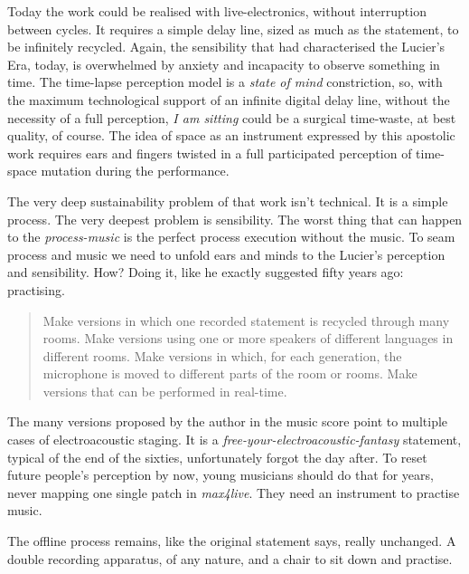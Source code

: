 \documentclass[twoside,a4paper]{article}
\begin{document}
Today the work could be realised with live-electronics, without interruption
between cycles. It requires a simple delay line, sized as much as the statement,
to be infinitely recycled. Again, the sensibility that had characterised the
Lucier's Era, today, is overwhelmed by anxiety and incapacity to observe something
in time. The time-lapse perception model is a \emph{state of mind} constriction,
so, with the maximum technological support of an infinite digital delay line,
without the necessity of a full perception, \emph{I am sitting} could be a
surgical time-waste, at best quality, of course. The idea of space as an
instrument expressed by this apostolic work requires ears and fingers twisted
in a full participated perception of time-space mutation during the performance.


The very deep sustainability problem of that work isn't technical. It is a
simple process. The very deepest problem is sensibility. The worst thing that
can happen to the \emph{process-music} is the perfect process execution without
the music. To seam process and music we need to unfold ears and minds to the
Lucier's perception and sensibility. How? Doing it, like he exactly suggested
fifty years ago: practising.

\begin{quote}
Make versions in which one recorded statement is recycled through many rooms.
Make versions using one or more speakers of different languages in different
rooms. Make versions in which, for each generation, the microphone is moved to
different parts of the room or rooms. Make versions that can be performed in
real-time. \cite{lais69}
\end{quote}

The many versions proposed by the author in the music score point to multiple
cases of electroacoustic staging. It is a \emph{free-your-electroacoustic-fantasy}
statement, typical of the end of the sixties, unfortunately forgot the day after.
To reset future people's perception by now, young musicians should do that for
years, never mapping one single patch in \emph{max4live}. They need an instrument
to practise music.

The offline process remains, like the original statement says, really unchanged.
A double recording apparatus, of any nature, and a chair to sit down and practise.
\end{document}
